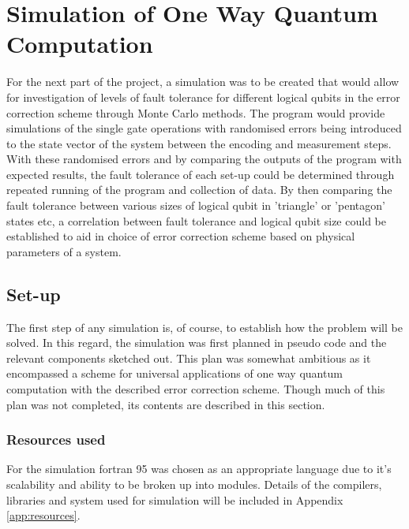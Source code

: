 
\chapter{Simulation of One Way Quantum Computation} %

\label{ch:simul} %

For the next part of the project, a simulation was to be created that would allow for investigation of levels of fault tolerance for different logical qubits in the error correction scheme through Monte Carlo methods. The program would provide simulations of the single gate operations with randomised errors being introduced to the state vector of the system between the encoding and measurement steps. With these randomised errors and by comparing the outputs of the program with expected results, the fault tolerance of each set-up could be determined through repeated running of the program and collection of data. By then comparing the fault tolerance between various sizes of logical qubit in 'triangle' or 'pentagon' states etc, a correlation between fault tolerance and logical qubit size could be established to aid in choice of error correction scheme based on physical parameters of a system.



\section{Set-up}

The first step of any simulation is, of course, to establish how the problem will be solved. In this regard, the simulation was first planned in pseudo code and the relevant components sketched out. This plan was somewhat ambitious as it encompassed a scheme for universal applications of one way quantum computation with the described error correction scheme. Though much of this plan was not completed, its contents are described in this section.


\subsection{Resources used}

For the simulation fortran 95 was chosen as an appropriate language due to it's scalability and ability to be broken up into modules. Details of the compilers, libraries and system used for simulation will be included in Appendix \ref{app:resources}.

